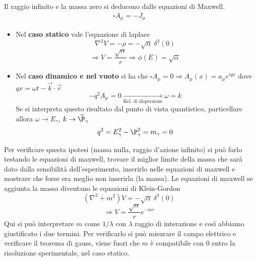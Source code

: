 \documentclass[12pt]{book}
\begin{document}
\bigskip
Il raggio infinito e la massa zero si deducono dalle equazioni di Maxwell.
\begin{gather}
	\square A_\mu = -J_\mu
\end{gather}
\begin{itemize}
	\item Nel \textbf{caso statico} vale l'equazione di laplace
\begin{equation}
	\nabla^2 V = - \rho = - \sqrt{\alpha} \ \delta^3(0)
\end{equation}
\begin{equation}
	\Rightarrow V = \frac{\sqrt{\alpha}}{r} \Rightarrow \phi(E) = \sqrt{\alpha}
\end{equation}

\item Nel \textbf{caso dinamico e nel vuoto} si ha che $\square A_\mu=0 \Rightarrow A_\mu (x) = a_\mu e^{iqx}$ dove $qx=\omega t - \vec k \cdot \vec r$
\begin{equation}
	-q^2 A_\mu =0 \underset{\text{Rel. di dispersione}}{\longrightarrow} \omega = k
\end{equation}
Se si interpreta questo risultato dal punto di vista quantistico, particellare allora $\omega \rightarrow E_\gamma$, $k \rightarrow \vec \P_\gamma$
\begin{equation}
	q^2 =E_\gamma^2 - \P_\gamma^2 = m_\gamma =0
\end{equation}
\end{itemize}

Per verificare questa ipotesi (massa nulla, raggio d'azione infinito) si può farlo testando le equazioni di maxwell, trovare il miglior limite della massa che sarà dato dalla sensibilità dell'esperimento, inserirlo nelle equazioni di maxwell e mostrare che forse era meglio non inserirla (la massa). Le equazioni di maxwell se aggiunta la massa diventano le equazioni di Klein-Gordon
\begin{equation}
	(\nabla^2 + m^2)V = - \sqrt{\alpha} \ \delta^3(0)
\end{equation}
\begin{equation}
	\Rightarrow V= \frac{\sqrt{\alpha}}{r}e^{-mr}
\end{equation}
Qui si può interpretare $m$ come $1/\lambda$ con $\lambda$ raggio di interazione e così abbiamo giustificato i due termini. Per verificarlo si può misurare il campo elettrico e verificare il teorema di gauss, viene fuori che $m$ è compatibile con $0$ entro la risoluzione sperimentale, nel caso statico. 
\end{document}
